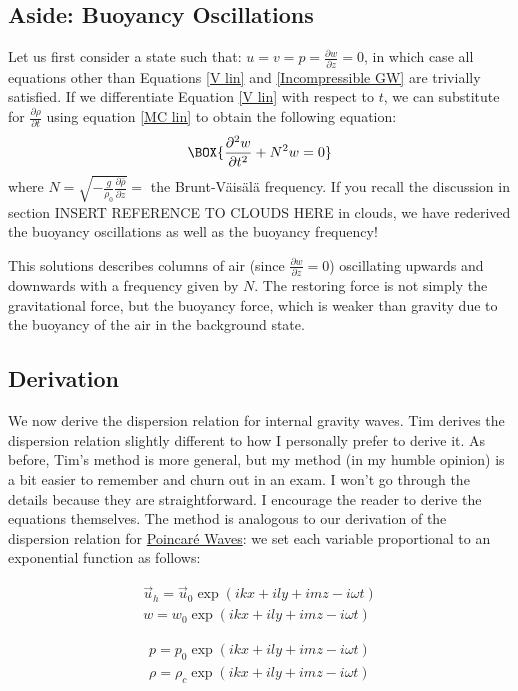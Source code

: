 \subsection{Aside: Buoyancy Oscillations}

Let us first consider a state such that: $u=v=p=\frac{\partial w}{\partial z}=0$, in which case all equations other than Equations \ref{V lin} and \ref{Incompressible GW} are trivially satisfied. If we differentiate Equation \ref{V lin} with respect to $t$, we can substitute for $\frac{\partial \rho}{\partial t}$ using equation \ref{MC lin} to obtain the following equation:
\begin{align}
    \BOX{\frac{\partial^2 w}{\partial t^2}+N^2 w = 0}
\end{align}
where $N = \sqrt{-\frac{g}{\rho_0}\frac{\partial \bar{\rho}}{\partial z}}=$ the Brunt-Väisälä frequency. If you recall the discussion in section INSERT REFERENCE TO CLOUDS HERE in clouds, we have rederived the buoyancy oscillations as well as the buoyancy frequency!

This solutions describes columns of air (since $\frac{\partial w}{\partial z}=0$) oscillating upwards and downwards with a frequency given by $N$. The restoring force is not simply the gravitational force, but the buoyancy force, which is weaker than gravity due to the buoyancy of the air in the background state.

\subsection{Derivation}

We now derive the dispersion relation for internal gravity waves. Tim derives the dispersion relation slightly different to how I personally prefer to derive it. As before, Tim's method is more general, but my method (in my humble opinion) is a bit easier to remember and churn out in an exam. I won't go through the details because they are straightforward. I encourage the reader to derive the equations themselves. The method is analogous to our derivation of the dispersion relation for \hyperref[2D Poincare]{Poincaré Waves}: we set each variable proportional to an exponential function as follows:

\begin{minipage}{0.48\linewidth}
    \begin{align*}
        \vec{u}_h = \vec{u}_0 \exp \left( ikx + ily + imz - i\omega t \right)
        \\
        w = w_0 \exp \left( ikx + ily + imz - i\omega t \right)
    \end{align*}
\end{minipage}
\hfill
\begin{minipage}{0.48\linewidth}
    \begin{align*}
        p = p_0 \exp \left( ikx + ily + imz - i\omega t \right)
        \\
        \rho = \rho_c \exp \left( ikx + ily + imz - i\omega t \right)
    \end{align*}
\end{minipage}

